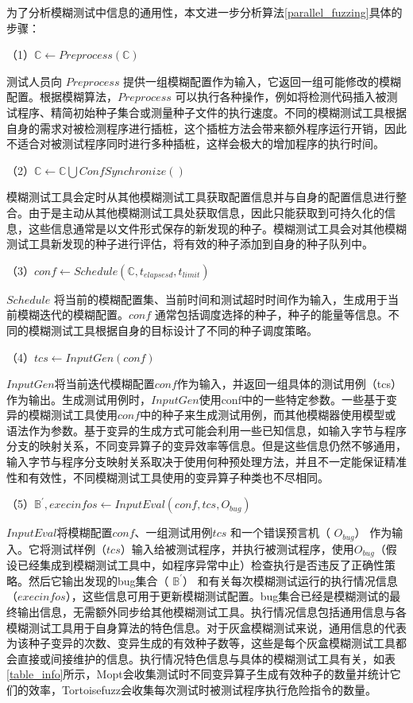 \documentclass[master]{thesis-uestc}
\begin{document}

为了分析模糊测试中信息的通用性，本文进一步分析算法\ref{parallel_fuzzing}具体的步骤：

（1）$\mathbb{C} \leftarrow Preprocess(\mathbb{C})$

测试人员向 $Preprocess$ 提供一组模糊配置作为输入，它返回一组可能修改的模糊配置。根据模糊算法，$Preprocess$ 可以执行各种操作，例如将检测代码插入被测试程序、精简初始种子集合或测量种子文件的执行速度。不同的模糊测试工具根据自身的需求对被检测程序进行插桩，这个插桩方法会带来额外程序运行开销，因此不适合对被测试程序同时进行多种插桩，这样会极大的增加程序的执行时间。

（2）$\mathbb{C} \leftarrow \mathbb{C} \bigcup ConfSynchronize()$

模糊测试工具会定时从其他模糊测试工具获取配置信息并与自身的配置信息进行整合。由于是主动从其他模糊测试工具处获取信息，因此只能获取到可持久化的信息，这些信息通常是以文件形式保存的新发现的种子。模糊测试工具会对其他模糊测试工具新发现的种子进行评估，将有效的种子添加到自身的种子队列中。

（3）$conf \leftarrow Schedule(\mathbb{C}, t_{elapsesd}, t_{limit})$

$Schedule$ 将当前的模糊配置集、当前时间和测试超时时间作为输入，生成用于当前模糊迭代的模糊配置。$conf$ 通常包括调度选择的种子，种子的能量等信息。不同的模糊测试工具根据自身的目标设计了不同的种子调度策略。

（4）$tcs \leftarrow InputGen(conf)$

$InputGen$将当前迭代模糊配置$conf$作为输入，并返回一组具体的测试用例（tcs）作为输出。生成测试用例时，$InputGen$使用conf中的一些特定参数。一些基于变异的模糊测试工具使用$conf$中的种子来生成测试用例，而其他模糊器使用模型或语法作为参数。基于变异的生成方式可能会利用一些已知信息，如输入字节与程序分支的映射关系，不同变异算子的变异效率等信息。但是这些信息仍然不够通用，输入字节与程序分支映射关系取决于使用何种预处理方法，并且不一定能保证精准性和有效性，不同模糊测试工具使用的变异算子种类也不尽相同。

（5）$\mathbb{B}^\prime, execinfos \leftarrow InputEval(conf, tcs, O_{bug})$

$InputEval$将模糊配置$conf$、一组测试用例$tcs$ 和一个错误预言机（ $O_{bug}$） 作为输入。它将测试样例（$tcs$）输入给被测试程序，并执行被测试程序，使用$O_{bug}$（假设已经集成到模糊测试工具中，如程序异常中止）检查执行是否违反了正确性策略。然后它输出发现的bug集合（ $\mathbb{B}^\prime$） 和有关每次模糊测试运行的执行情况信息（$execinfos$），这些信息可用于更新模糊测试配置。bug集合已经是模糊测试的最终输出信息，无需额外同步给其他模糊测试工具。执行情况信息包括通用信息与各模糊测试工具用于自身算法的特色信息。对于灰盒模糊测试来说，通用信息的代表为该种子变异的次数、变异生成的有效种子数等，这些是每个灰盒模糊测试工具都会直接或间接维护的信息。执行情况特色信息与具体的模糊测试工具有关，如表\ref{table_info}所示，Mopt会收集测试时不同变异算子生成有效种子的数量并统计它们的效率，Tortoisefuzz会收集每次测试时被测试程序执行危险指令的数量。
\end{document}
